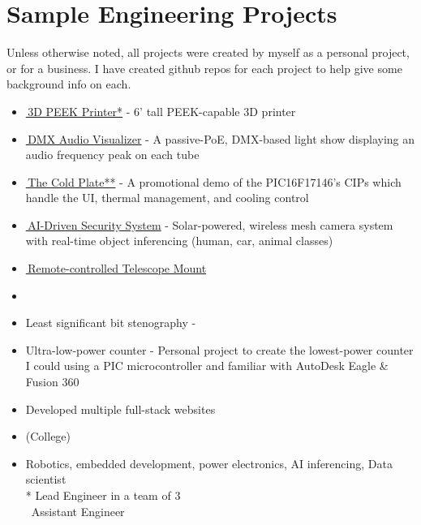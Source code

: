 \documentclass[
	10pt, %
]{FreemanCV}
\begin{document}
\section{Sample Engineering Projects}
{
	Unless otherwise noted, all projects were created by myself as a personal project, or for a business. I have created github repos for each project to help give some background info on each.
	\vspace*{-7pt}
	\begin{itemize}[leftmargin=10pt]
		\itemsep-5pt
		\item \href{https://github.com/jfcbooth/3dpp}{\linkcolor\scriptsize\faLink\normalcolor\normalsize\,3D PEEK Printer*}
		- 6' tall PEEK-capable 3D printer
		\item \href{https://github.com/microchip-pic-avr-examples/pic16f56q71-audio-light-show-mplab-mcc}{\linkcolor\scriptsize\faLink\normalcolor\normalsize\,DMX Audio Visualizer}
		- A passive-PoE, DMX-based light show displaying an audio frequency peak on each tube
		\item \href{https://github.com/microchip-pic-avr-examples/pic16f17146-cold-plate-mplab-mcc}{\linkcolor\scriptsize\faLink\normalcolor\normalsize\,The Cold Plate**}
		- A promotional demo of the PIC16F17146's CIPs which handle the UI, thermal management, and cooling control
		\item \href{https://github.com/jfcbooth/security_system}{\linkcolor\scriptsize\faLink\normalcolor\normalsize\,AI-Driven Security System}
		- Solar-powered, wireless mesh camera system with real-time object inferencing (human, car, animal classes)
		\item \href{https://github.com/jfcbooth/hadley_electric_stand}{\linkcolor\scriptsize\faLink\normalcolor\normalsize\,Remote-controlled Telescope Mount}
		\item 
		\item Least significant bit stenography - 
		\item Ultra-low-power counter - Personal project to create the lowest-power counter I could using a PIC microcontroller and familiar with AutoDesk Eagle \& Fusion 360
		\item Developed multiple full-stack websites
		\item (College) 
		\item Robotics, embedded development, power electronics, AI inferencing, Data scientist \\
		* Lead Engineer in a team of 3 \\
		\textasteriskcentered\textasteriskcentered\, Assistant Engineer
	\end{itemize}
} %
\end{document}
